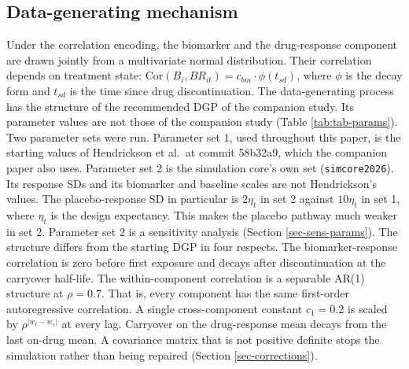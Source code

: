 \documentclass[
  11pt,
]{article}
\begin{document}
\subsection{Data-generating mechanism}\label{sec-dgm}

Under the correlation encoding, the biomarker and the drug-response
component are drawn jointly from a multivariate normal distribution.
Their correlation depends on treatment state: \(\text{Cor}(B_i,
BR_{it}) = c_{bm} \cdot \phi(t_{sd})\), where \(\phi\) is the decay
form and \(t_{sd}\) is the time since drug discontinuation. The
data-generating process has the structure of the recommended DGP of
the companion study. Its parameter values are not those of the
companion study (Table \ref{tab:tab-params}). Two parameter sets
were run. Parameter set 1, used throughout this paper, is the
starting values of Hendrickson et al.~at commit 58b32a9, which the
companion paper also uses. Parameter set 2 is the simulation core's
own set (\texttt{simcore2026}). Its response SDs and its biomarker and
baseline scales are not Hendrickson's values. The placebo-response
SD in particular is \(2\eta_t\) in set 2 against \(10\eta_t\) in set 1,
where \(\eta_t\) is the design expectancy. This makes the placebo
pathway much weaker in set 2. Parameter set 2 is a sensitivity
analysis (Section \ref{sec-sens-params}). The structure differs from the
starting DGP in four respects. The biomarker-response correlation is
zero before first exposure and decays after discontinuation at the carryover
half-life. The within-component correlation is a separable AR(1)
structure at \(\rho = 0.7\). That is, every component has the same
first-order autoregressive correlation. A single cross-component
constant \(c_1 = 0.2\) is scaled by \(\rho^{|w_t - w_s|}\) at every lag.
Carryover on the drug-response mean decays from the last on-drug
mean. A covariance matrix that is not positive definite stops the
simulation rather than being repaired (Section
\ref{sec-corrections}).
\end{document}
